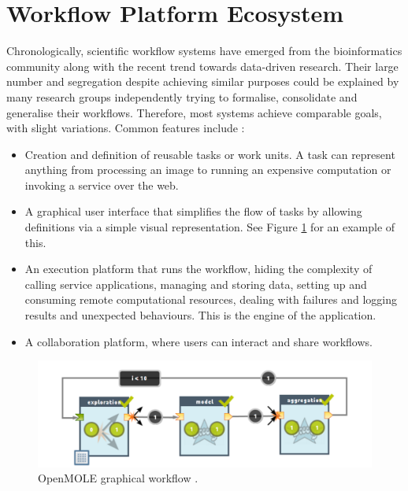 \documentclass[11pt,a4paper]{report}
\begin{document}

\section{Workflow Platform Ecosystem}

Chronologically, scientific workflow systems have emerged from the bioinformatics community along with the recent trend towards data-driven research. Their large number and segregation despite achieving similar purposes could be explained by many research groups independently trying to formalise, consolidate and generalise their workflows. Therefore, most systems achieve comparable goals, with slight variations. Common features include \cite{Goble2009}:

\begin{itemize}
	\item Creation and definition of reusable tasks or work units. A task can represent anything from processing an image to running an expensive computation or invoking a service over the web.
	\item A graphical user interface that simplifies the flow of tasks by allowing definitions via a simple visual representation. See Figure \ref{OpenMOLEGUI} for an example of this.
	\item An execution platform that runs the workflow, hiding the complexity of calling service applications, managing and storing data, setting up and consuming remote computational resources, dealing with failures and logging results and unexpected behaviours. This is the engine of the application.
	\item A collaboration platform, where users can interact and share workflows.
\end{itemize}

\begin{figure}[h]
	\centering
		\includegraphics[scale=0.30]{figures/OpenMOLEGUI.png}
	\caption{OpenMOLE graphical workflow \cite{Reuillon2012}.}
	\label{OpenMOLEGUI}
\end{figure}
\end{document}
